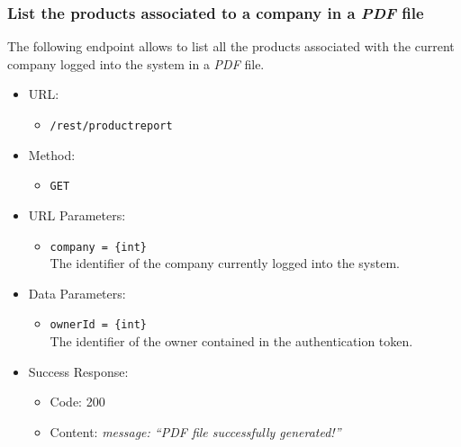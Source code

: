 \newpage
\subsubsection*{List the products associated to a company in a \textit{PDF} file}

The following endpoint allows to list all the products associated with the current company logged into the system in a \textit{PDF} file.

\begin{itemize}

    \item URL:
    \begin{itemize}
        \item \texttt{/rest/productreport}
    \end{itemize}

    \item Method:
    \begin{itemize}
        \item \texttt{GET}
    \end{itemize}

    \item URL Parameters:
    \begin{itemize}
        \item \texttt{company = \{int\}} \\
        The identifier of the company currently logged into the system.
    \end{itemize}

    \item Data Parameters:
    \begin{itemize}
        \item \texttt{ownerId = \{int\}} \\
        The identifier of the owner contained in the authentication token.
    \end{itemize}

    \item Success Response:
    \begin{itemize}
        \item Code: 200
        \item Content:
        \textit{
{
    message: “PDF file successfully generated!”
}
        }
    \end{itemize}


\end{itemize}

